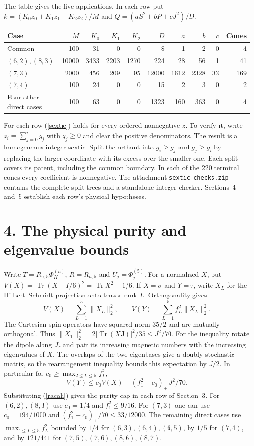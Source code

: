 \documentclass[11pt,a4paper]{article}
\newcommand{\Tr}{\operatorname{Tr}}
\begin{document}
The table gives the five applications. In each row put
$k=(K_0 z_0+K_1 z_1+K_2 z_2)/M$ and $Q=(aS^2+bP+cJ^2)/D$.
\begin{center}\small
\begin{tabular}{lrrrrrrrrr}\toprule
Case & $M$ & $K_0$ & $K_1$ & $K_2$ & $D$ & $a$ & $b$ & $c$ & Cones\\\midrule
Common &100&31&0&0&8&1&2&0&4\\
$(6,2),(8,3)$&10000&3433&2203&1270&224&28&56&1&41\\
$(7,3)$&2000&456&209&95&12000&1612&2328&33&169\\
$(7,4)$&100&24&0&0&15&2&3&0&2\\
Four other direct cases&100&63&0&0&1323&160&363&0&4\\\bottomrule
\end{tabular}\end{center}
For each row (\ref{sextic}) holds for every ordered nonnegative $z$. To verify it, write $z_i=\sum_{j=0}^i g_j$ with $g_j\ge0$ and clear the positive denominators. The result is a homogeneous integer sextic. Split the orthant into $g_i\ge g_j$ and $g_j\ge g_i$ by replacing the larger coordinate with its excess over the smaller one. Each split covers its parent, including the common boundary. In each of the 220 terminal cones every coefficient is nonnegative. The attachment \texttt{sextic-checks.zip} contains the complete split trees and a standalone integer checker. Sections~4 and~5 establish each row's physical hypotheses.

\newpage
\section*{4. The physical purity and eigenvalue bounds}
Write $T=R_{n,5}\Phi_K^{(n)}$, $R=R_{n,5}$ and $U_j=\Phi_j^{(5)}$. For a normalized $X$, put $V(X)=\Tr(X-I/6)^2=\Tr X^2-1/6$. If $X=\sigma$ and $Y=\tau$, write $X_L$ for the Hilbert--Schmidt projection onto tensor rank $L$. Orthogonality gives
\[
 V(X)=\sum_{L=1}^5\|X_L\|_2^2,\qquad
 V(Y)=\sum_{L=1}^5 f_L^2\|X_L\|_2^2 .
\]
The Cartesian spin operators have squared norm $35/2$ and are mutually orthogonal. Thus $\|X_1\|_2^2=2|\Tr(X\mathbf J)|^2/35\le J^2/70$. For the inequality rotate the dipole along $J_z$ and pair its increasing magnetic numbers with the increasing eigenvalues of $X$. The overlaps of the two eigenbases give a doubly stochastic matrix, so the rearrangement inequality bounds this expectation by $J/2$. In particular for $c_0\ge\max_{2\le L\le5} f_L^2$,
\[
 V(Y)\le c_0 V(X)+(f_1^2-c_0)_+\,J^2/70.
\]
Substituting (\ref{racah}) gives the purity cap in each row of Section~3. For $(6,2),(8,3)$ use $c_0=1/4$ and $f_1^2\le9/16$. For $(7,3)$ one can use $c_0=194/1000$ and $(f_1^2-c_0)_+/70\le 33/12000$. The remaining direct cases use $\max_{1\le L\le5} f_L^2$ bounded by $1/4$ for $(6,3),(6,4),(6,5)$, by $1/5$ for $(7,4)$, and by $121/441$ for $(7,5),(7,6),(8,6),(8,7)$.
\end{document}
